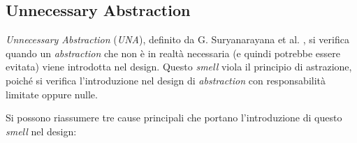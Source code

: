 \subsection{Unnecessary Abstraction}
    \textit{Unnecessary Abstraction} (\textit{UNA}), definito da G. Suryanarayana et al. \cite{SURYANARAYANA201521}, si verifica quando un \textit{abstraction} che non è in realtà necessaria (e quindi potrebbe essere evitata) viene introdotta nel design.
    Questo \textit{smell} viola il principio di astrazione, poiché si verifica l'introduzione nel design di \textit{abstraction} con responsabilità limitate oppure nulle.
    
    Si possono riassumere tre cause principali che portano l'introduzione di questo \textit{smell} nel design:
